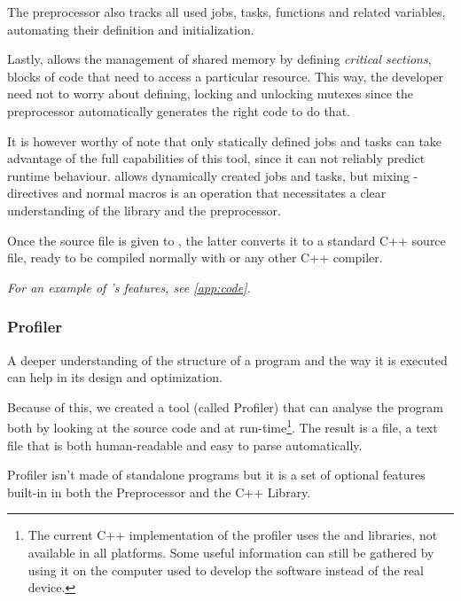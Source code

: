   The preprocessor also tracks all used jobs, tasks, functions and
  related variables, automating their definition and initialization.
  
  Lastly,  allows the management of shared memory
  by defining \textit{critical sections}, blocks of code that need
  to access a particular resource. This way, the developer need not
  to worry about defining, locking and unlocking mutexes since the
  preprocessor automatically generates the right code to do that.
  
  It is however worthy of note that only statically defined jobs and
  tasks can take advantage of the full capabilities of this tool,
  since it can not reliably predict runtime behaviour. \ScheMo{} allows
  dynamically created jobs and tasks, but mixing
  -directives and normal macros is an operation that
  necessitates a clear understanding of the library and the
  preprocessor.
  
  Once the source file is given to , the latter
  converts it to a standard C++ source file, ready to be compiled
  normally with  or any other C++ compiler.
  
  \textit{For an example of \ScheMo{}'s features, see \autoref{app:code}.}
  
\subsubsection{\ScheMo{} Profiler}
\label{sssec:schemoprofile}
  A deeper understanding of the structure of a \ScheMo{} program and the
  way it is executed can help in its design and optimization.

  Because of this, we created a tool (called \ScheMo{} Profiler) that can
  analyse the program both by looking at the source code and at
  run-time\footnote{The current C++ implementation of the profiler uses
  the  and  libraries, not available in all
  platforms. Some useful information can still be gathered by using it
  on the computer used to develop the software instead of the real
  device.}. The result is a  file, a text file that is
  both human-readable and easy to parse automatically.

  \ScheMo{} Profiler isn't made of standalone programs but it is
  a set of optional features built-in in both the \ScheMo{} Preprocessor
  and the \ScheMo{} C++ Library.
  
